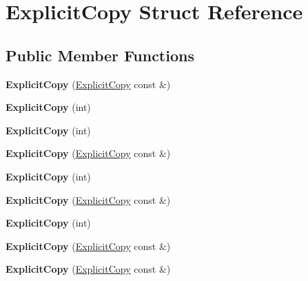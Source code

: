 \hypertarget{struct_explicit_copy}{}\section{Explicit\+Copy Struct Reference}
\label{struct_explicit_copy}
\subsection*{Public Member Functions}
\begin{DoxyCompactItemize}
\item 
\mbox{\label{struct_explicit_copy_a8b6e871e499b5afd174281b77a2f6a1b}} 
{\bfseries Explicit\+Copy} (\mbox{\hyperlink{struct_explicit_copy}{Explicit\+Copy}} const \&)
\item 
\mbox{\label{struct_explicit_copy_ae051f1baddad1fc51036422dfa63d1b7}} 
{\bfseries Explicit\+Copy} (int)
\item 
\mbox{\label{struct_explicit_copy_ae051f1baddad1fc51036422dfa63d1b7}} 
{\bfseries Explicit\+Copy} (int)
\item 
\mbox{\label{struct_explicit_copy_a8b6e871e499b5afd174281b77a2f6a1b}} 
{\bfseries Explicit\+Copy} (\mbox{\hyperlink{struct_explicit_copy}{Explicit\+Copy}} const \&)
\item 
\mbox{\label{struct_explicit_copy_ae051f1baddad1fc51036422dfa63d1b7}} 
{\bfseries Explicit\+Copy} (int)
\item 
\mbox{\label{struct_explicit_copy_a8b6e871e499b5afd174281b77a2f6a1b}} 
{\bfseries Explicit\+Copy} (\mbox{\hyperlink{struct_explicit_copy}{Explicit\+Copy}} const \&)
\item 
\mbox{\label{struct_explicit_copy_ae051f1baddad1fc51036422dfa63d1b7}} 
{\bfseries Explicit\+Copy} (int)
\item 
\mbox{\label{struct_explicit_copy_a8b6e871e499b5afd174281b77a2f6a1b}} 
{\bfseries Explicit\+Copy} (\mbox{\hyperlink{struct_explicit_copy}{Explicit\+Copy}} const \&)
\item 
\mbox{\label{struct_explicit_copy_a8b6e871e499b5afd174281b77a2f6a1b}} 
{\bfseries Explicit\+Copy} (\mbox{\hyperlink{struct_explicit_copy}{Explicit\+Copy}} const \&)
\end{DoxyCompactItemize}



